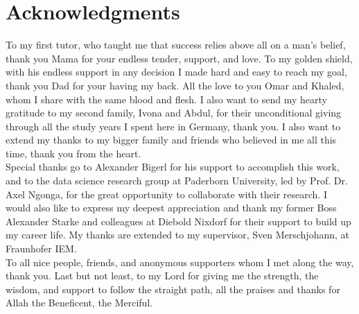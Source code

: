 \chapter*{Acknowledgments}
\thispagestyle{empty}


To my first tutor, who taught me that success relies above all on a man's belief, thank you Mama for your endless tender, support, and love. To my golden shield, with his endless support in any decision I made hard and easy to reach my goal, thank you Dad for your having my back. All the love to you Omar and Khaled, whom I share with the same blood and flesh. I also want to send my hearty gratitude to my second family, Ivona and Abdul, for their unconditional giving through all the study years I spent here in Germany, thank you. I also want to extend my thanks to my bigger family and friends who believed in me all this time, thank you from the heart. \\

Special thanks go to Alexander Bigerl for his support to accomplish this work, and to the data science research group at Paderborn University, led by Prof. Dr. Axel Ngonga, for the great opportunity to collaborate with their research. I would also like to express my deepest appreciation and thank my former Boss Alexander Starke and colleagues at Diebold Nixdorf for their support to build up my career life. My thanks are extended to my supervisor, Sven Merschjohann, at Fraunhofer IEM. \\

To all nice people, friends, and anonymous supporters whom I met along the way, thank you. Last but not least, to my Lord for giving me the strength, the wisdom, and support to follow the straight path, all the praises and thanks for Allah the Beneficent, the Merciful.\\  